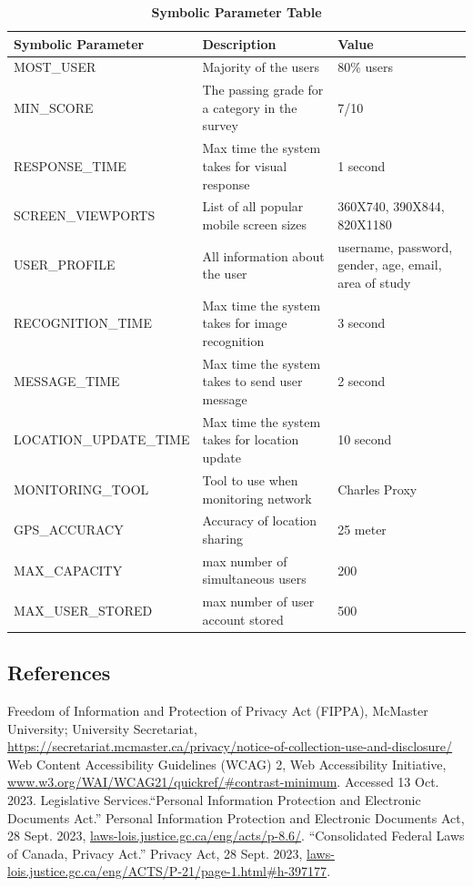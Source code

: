 \documentclass[12pt]{article}
\begin{document}
\begin{table}[H]
\caption{\bf Symbolic Parameter Table}
\begin{tabular}{|p{0.4\linewidth} | p{0.3\linewidth}| p{0.3\linewidth} |}
\hline
\multicolumn{1}{|l}{\bfseries Symbolic Parameter} & \multicolumn{1}{|l|}{\bfseries Description} & \multicolumn{1}{l|}{\bfseries Value}\\
\hline
MOST\_USER & Majority of the users & 80\% users \\
\hline
MIN\_SCORE & The passing grade for a category in the survey & 7/10\\
\hline
RESPONSE\_TIME & Max time the system takes for visual response & 1 second\\
\hline
SCREEN\_VIEWPORTS & List of all popular mobile screen sizes & 360X740, 390X844, 820X1180\\
\hline
USER\_PROFILE & All information about the user & username, password, gender, age, email, area of study\\
\hline
RECOGNITION\_TIME & Max time the system takes for image recognition & 3 second\\
\hline
MESSAGE\_TIME & Max time the system takes to send user message & 2 second\\
\hline
LOCATION\_UPDATE\_TIME & Max time the system takes for location update & 10 second\\
\hline
MONITORING\_TOOL & Tool to use when monitoring network & Charles Proxy\\
\hline
GPS\_ACCURACY & Accuracy of location sharing & 25 meter\\
\hline
MAX\_CAPACITY & max number of simultaneous users & 200\\
\hline
MAX\_USER\_STORED & max number of user account stored & 500\\
\hline
\end{tabular}
\end{table}

\subsection{References}
\begin{thebibliography}{9}
   Freedom of Information and Protection of Privacy Act (FIPPA), McMaster University; University Secretariat, \url{https://secretariat.mcmaster.ca/privacy/notice-of-collection-use-and-disclosure/}
   Web Content Accessibility Guidelines (WCAG) 2, Web Accessibility Initiative, \url{www.w3.org/WAI/WCAG21/quickref/#contrast-minimum}. Accessed 13 Oct. 2023. 
   Legislative Services.``Personal Information Protection and Electronic Documents Act.'' Personal Information Protection and Electronic Documents Act, 28 Sept. 2023, \url{laws-lois.justice.gc.ca/eng/acts/p-8.6/}. 
   ``Consolidated Federal Laws of Canada, Privacy Act.'' Privacy Act, 28 Sept. 2023, \url{laws-lois.justice.gc.ca/eng/ACTS/P-21/page-1.html#h-397177}. 
\end{thebibliography}
\end{document}
